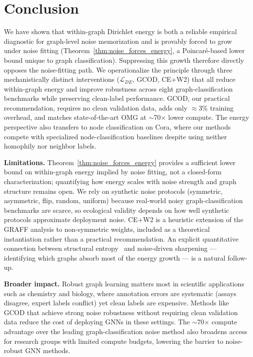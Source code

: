 \documentclass{article}
\theoremstyle{definition}
\newcommand{\method}{GCOD}
\begin{document}
\section{Conclusion}

We have shown that within-graph Dirichlet energy is both a reliable empirical diagnostic for graph-level noise memorization and is provably forced to grow under noise fitting (Theorem~\ref{thm:noise_forces_energy}, a Poincar\'e-based lower bound unique to graph classification). Suppressing this growth therefore directly opposes the noise-fitting path. We operationalize the principle through three mechanistically distinct interventions ($\mathcal{L}_{DE}$, \method{}, CE+W2) that all reduce within-graph energy and improve robustness across eight graph-classification benchmarks while preserving clean-label performance. \method{}, our practical recommendation, requires no clean validation data, adds only $\approx$3\% training overhead, and matches state-of-the-art OMG at $\sim$70$\times$ lower compute. The energy perspective also transfers to node classification on Cora, where our methods compete with specialized node-classification baselines despite using neither homophily nor neighbor labels.

\textbf{Limitations.} Theorem~\ref{thm:noise_forces_energy} provides a sufficient lower bound on within-graph energy implied by noise fitting, not a closed-form characterization; quantifying how energy scales with noise strength and graph structure remains open. We rely on synthetic noise protocols (symmetric, asymmetric, flip, random, uniform) because real-world noisy graph-classification benchmarks are scarce, so ecological validity depends on how well synthetic protocols approximate deployment noise. CE+W2 is a heuristic extension of the GRAFF analysis to non-symmetric weights, included as a theoretical instantiation rather than a practical recommendation. An explicit quantitative connection between structural entropy~\citep{exploreOversmoothing} and noise-driven sharpening — identifying which graphs absorb most of the energy growth — is a natural follow-up.

\textbf{Broader impact.} Robust graph learning matters most in scientific applications such as chemistry and biology, where annotation errors are systematic (assays disagree, expert labels conflict) yet clean labels are expensive. Methods like \method{} that achieve strong noise robustness without requiring clean validation data reduce the cost of deploying GNNs in these settings. The $\sim$70$\times$ compute advantage over the leading graph-classification noise method also broadens access for research groups with limited compute budgets, lowering the barrier to noise-robust GNN methods.




\appendix
\clearpage


\clearpage

\end{document}
